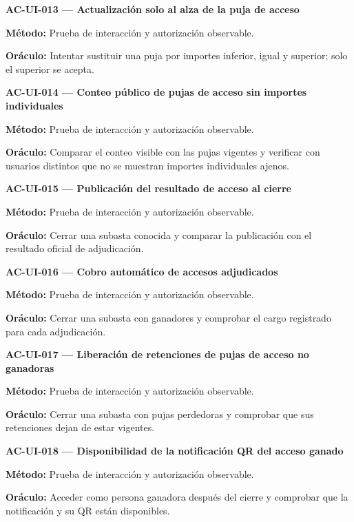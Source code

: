\documentclass[10pt,letterpaper]{article}
\begin{document}
\noindent\textbf{AC-UI-013 --- Actualización solo al alza de la puja de acceso}\par
\textbf{Método:} Prueba de interacción y autorización observable.\par
\textbf{Oráculo:} Intentar sustituir una puja por importes inferior, igual y superior; solo el superior se acepta.\par\vspace{0.45em}
\noindent\textbf{AC-UI-014 --- Conteo público de pujas de acceso sin importes individuales}\par
\textbf{Método:} Prueba de interacción y autorización observable.\par
\textbf{Oráculo:} Comparar el conteo visible con las pujas vigentes y verificar con usuarios distintos que no se muestran importes individuales ajenos.\par\vspace{0.45em}
\noindent\textbf{AC-UI-015 --- Publicación del resultado de acceso al cierre}\par
\textbf{Método:} Prueba de interacción y autorización observable.\par
\textbf{Oráculo:} Cerrar una subasta conocida y comparar la publicación con el resultado oficial de adjudicación.\par\vspace{0.45em}
\noindent\textbf{AC-UI-016 --- Cobro automático de accesos adjudicados}\par
\textbf{Método:} Prueba de interacción y autorización observable.\par
\textbf{Oráculo:} Cerrar una subasta con ganadores y comprobar el cargo registrado para cada adjudicación.\par\vspace{0.45em}
\noindent\textbf{AC-UI-017 --- Liberación de retenciones de pujas de acceso no ganadoras}\par
\textbf{Método:} Prueba de interacción y autorización observable.\par
\textbf{Oráculo:} Cerrar una subasta con pujas perdedoras y comprobar que sus retenciones dejan de estar vigentes.\par\vspace{0.45em}
\noindent\textbf{AC-UI-018 --- Disponibilidad de la notificación QR del acceso ganado}\par
\textbf{Método:} Prueba de interacción y autorización observable.\par
\textbf{Oráculo:} Acceder como persona ganadora después del cierre y comprobar que la notificación y su QR están disponibles.\par\vspace{0.45em}
\end{document}
